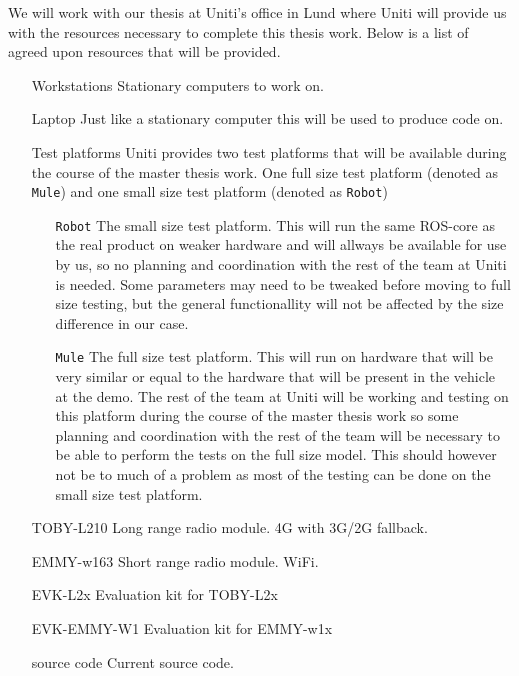 \documentclass[a4paper]{article}
\begin{document}

We will work with our thesis at Uniti's office in Lund where Uniti will provide
us with the resources necessary to complete this thesis work. Below is a list of
agreed upon resources that will be provided.

\begin{itemize}
	\item[Workstations] Stationary computers to work on.
	\item[Laptop] Just like a stationary computer this will be used to produce
		code on.
	\item[Test platforms] Uniti provides two test platforms that will be available
		during the course of the master thesis work. One full size test platform
		(denoted as \texttt{Mule}) and one small size test platform (denoted as
		\texttt{Robot})
		\begin{itemize}
			\item[\texttt{Robot}] The small size test platform. This will run the same
				ROS-core as the real product on weaker hardware and will allways be
				available for use by us, so no planning and coordination with the rest
				of the team at Uniti is needed. Some parameters may need to be tweaked
				before moving to full size testing, but the general functionallity will
				not be affected by the size difference in our case.
			\item[\texttt{Mule}] The full size test platform. This will run on
				hardware that will be very similar or equal to the hardware that will be
				present in the vehicle at the demo. The rest of the team at Uniti will
				be working and testing on this platform during the course of the master
				thesis work so some planning and coordination with the rest of the team
				will be necessary to be able to perform the tests on the full size
				model. This should however not be to much of a problem as most of the
				testing can be done on the small size test platform.
		\end{itemize}
	\item[TOBY-L210] Long range radio module. 4G with 3G/2G fallback.
	\item[EMMY-w163] Short range radio module. WiFi.
	\item[EVK-L2x] Evaluation kit for TOBY-L2x
	\item[EVK-EMMY-W1] Evaluation kit for EMMY-w1x
	\item[source code] Current source code.

\end{itemize}
\end{document}
